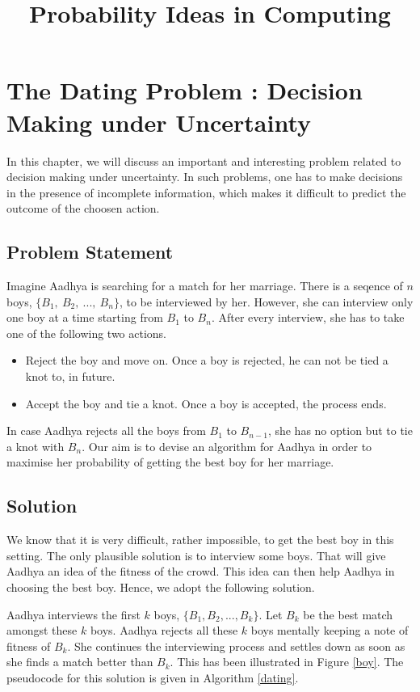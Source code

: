 \documentclass{book}
\title{Probability Ideas in Computing}
\begin{document}
\chapter{The Dating Problem : Decision Making under Uncertainty}

In this chapter, we will discuss an important and interesting problem related to decision making under uncertainty. In such problems, one has to make decisions in the presence of incomplete information, which makes it difficult to predict the outcome of the choosen action. 

\section{Problem Statement}

Imagine Aadhya is searching for a match for her marriage. There is a seqence of $n$ boys, $\{B_1,\ B_2,\ ..., \ B_{n}\} $, to be interviewed by her. However, she can interview only one boy at a time starting from $B_1$ to $B_n$. After every interview, she has to take one of the following two actions. 
\begin{itemize}
\item Reject the boy and move on. Once a boy is rejected, he can not be tied a knot to, in future.  
\item Accept the boy and tie a knot. Once a boy is accepted, the process ends.
\end{itemize}
In case Aadhya rejects all the boys from $B_1$ to $B_{n-1}$, she has no option but to tie a knot with $B_n$. Our aim is to devise an algorithm for Aadhya in order to maximise her probability of getting the best boy for her marriage. 

\section{Solution}
We know that it is very difficult, rather impossible, to get the best boy in this setting. The only plausible solution is to interview some boys. That will give Aadhya an idea of the fitness of the crowd. This idea can then help Aadhya in choosing the best boy. Hence, we adopt the following solution.

\begin{tcolorbox}
Aadhya interviews the first $k$ boys, $\{B_1, B_2, ..., B_k\}$. Let $B_k$ be the best match amongst these $k$ boys. Aadhya rejects all these $k$ boys mentally keeping a note of fitness of $B_k$. She continues the interviewing process and settles down as soon as she finds a match better than $B_k$. This has been illustrated in Figure \ref{boy}. The pseudocode for this solution is given in Algorithm \ref{dating}.
\end{tcolorbox}
\end{document}
